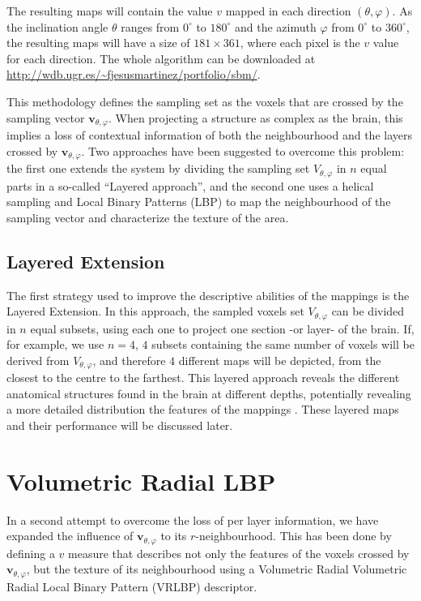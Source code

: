 The resulting maps will contain the value $v$ mapped in each direction $(\theta,\varphi)$. As the inclination angle $\theta$ ranges from $0^{\circ}$ to $180^{\circ}$ and the azimuth $\varphi$ from $0^{\circ}$ to $360^{\circ}$, the resulting maps will have a size of $181\times361$, where each pixel is the $v$ value for each direction. The whole algorithm can be downloaded at \url{http://wdb.ugr.es/~fjesusmartinez/portfolio/sbm/}.

This methodology defines the sampling set as the voxels that are crossed by the sampling vector $\mathbf{v}_{\theta,\varphi}$. When projecting a structure as complex as the brain, this implies a loss of contextual information of both the neighbourhood and the layers crossed by $\mathbf{v}_{\theta,\varphi}$. Two approaches have been suggested to overcome this problem: the first one extends the system by dividing the sampling set $V_{\theta,\varphi}$ in $n$ equal parts in a so-called ``Layered approach'', and the second one uses a helical sampling and Local Binary Patterns (LBP) to map the neighbourhood of the sampling vector and characterize the texture of the area.


\subsection{Layered Extension}\label{sec:layered}
The first strategy used to improve the descriptive abilities of the mappings is the Layered Extension. In this approach, the sampled voxels set $V_{\theta,\varphi}$ can be divided in $n$ equal subsets, using each one to project one section -or layer- of the brain. If, for example, we use $n=4$, $4$ subsets containing the same number of voxels  will be derived from $V_{\theta,\varphi}$, and therefore $4$ different maps  will be depicted, from the closest to the centre to the farthest. This layered approach reveals  the different anatomical structures found in the brain at different depths, potentially revealing a more detailed distribution the features  of the mappings . These layered maps and their performance will be discussed later.

\section{Volumetric Radial LBP}\label{sec:vrlbp}
In a second attempt to overcome the loss of per layer information, we have expanded the influence of $\mathbf{v}_{\theta,\varphi}$ to its $r$-neighbourhood. This has been done by defining a $v$ measure that describes not only the features of the voxels crossed by $\mathbf{v}_{\theta,\varphi}$, but the texture of its neighbourhood using a Volumetric Radial Volumetric Radial Local Binary Pattern (VRLBP) descriptor.

